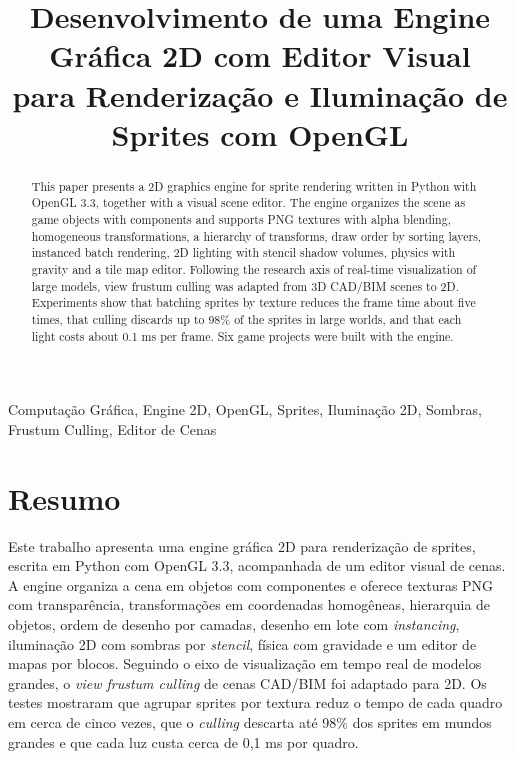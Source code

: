 \documentclass[conference]{IEEEtran}
\begin{document}
\title{Desenvolvimento de uma Engine Gráfica 2D com Editor Visual \\ para Renderização e Iluminação de Sprites com OpenGL}
\author{
}
\maketitle
\begin{abstract}
This paper presents a 2D graphics engine for sprite rendering written in Python with OpenGL 3.3, together with a visual scene editor. The engine organizes the scene as game objects with components and supports PNG textures with alpha blending, homogeneous transformations, a hierarchy of transforms, draw order by sorting layers, instanced batch rendering, 2D lighting with stencil shadow volumes, physics with gravity and a tile map editor. Following the research axis of real-time visualization of large models, view frustum culling was adapted from 3D CAD/BIM scenes to 2D. Experiments show that batching sprites by texture reduces the frame time about five times, that culling discards up to 98\% of the sprites in large worlds, and that each light costs about 0.1 ms per frame. Six game projects were built with the engine.
\end{abstract}
\begin{IEEEkeywords}
Computação Gráfica, Engine 2D, OpenGL, Sprites, Iluminação 2D, Sombras, Frustum Culling, Editor de Cenas
\end{IEEEkeywords}
\section*{Resumo}
Este trabalho apresenta uma engine gráfica 2D para renderização de sprites, escrita em Python com OpenGL 3.3, acompanhada de um editor visual de cenas. A engine organiza a cena em objetos com componentes e oferece texturas PNG com transparência, transformações em coordenadas homogêneas, hierarquia de objetos, ordem de desenho por camadas, desenho em lote com \textit{instancing}, iluminação 2D com sombras por \textit{stencil}, física com gravidade e um editor de mapas por blocos. Seguindo o eixo de visualização em tempo real de modelos grandes, o \textit{view frustum culling} de cenas CAD/BIM foi adaptado para 2D. Os testes mostraram que agrupar sprites por textura reduz o tempo de cada quadro em cerca de cinco vezes, que o \textit{culling} descarta até 98\% dos sprites em mundos grandes e que cada luz custa cerca de 0,1 ms por quadro.
\end{document}

